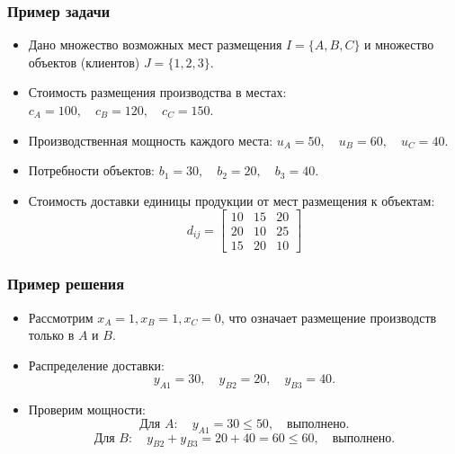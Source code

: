 \documentclass[12pt]{beamer}
\begin{document}
    \begin{frame}
        \frametitle{Пример задачи}
    
        \begin{itemize}
            \item Дано множество возможных мест размещения \( I = \{A, B, C\} \) и множество объектов (клиентов) \( J = \{1, 2, 3\} \).
            \item Стоимость размещения производства в местах: $c_A = 100, \quad c_B = 120, \quad c_C = 150.$
            \item Производственная мощность каждого места: $u_A = 50, \quad u_B = 60, \quad u_C = 40.$
            \item Потребности объектов: $b_1 = 30, \quad b_2 = 20, \quad b_3 = 40.$
            \item Стоимость доставки единицы продукции от мест размещения к объектам:
            \[
            d_{ij} = 
            \begin{bmatrix}
            10 & 15 & 20 \\
            20 & 10 & 25 \\
            15 & 20 & 10
            \end{bmatrix}
            \]
        \end{itemize}
    
    \end{frame}

    \begin{frame}
        \frametitle{Пример решения}
    
        \begin{itemize}
            \item Рассмотрим \( x_A = 1, x_B = 1, x_C = 0 \), что означает размещение производств только в \( A \) и \( B \).
            \item Распределение доставки:
            \[
            y_{A1} = 30, \quad y_{B2} = 20, \quad y_{B3} = 40.
            \]
            \item Проверим мощности:
            \[
            \text{Для } A: \quad y_{A1} = 30 \leq 50, \quad \text{выполнено.}
            \]
            \[
            \text{Для } B: \quad y_{B2} + y_{B3} = 20 + 40 = 60 \leq 60, \quad \text{выполнено.}
            \]
        \end{itemize}
    
    \end{frame}
\end{document}
